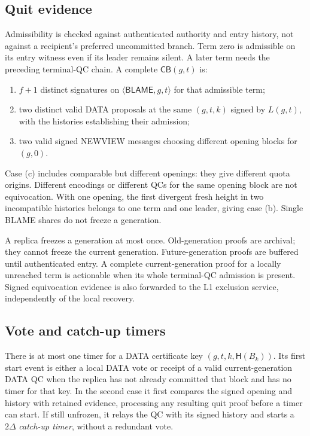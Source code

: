 \documentclass[11pt,a4paper]{article}
\newcommand{\CB}{\mathsf{CB}}
\newcommand{\Hash}{\mathsf H}
\newcommand{\tagg}[1]{\mathsf{#1}}
\begin{document}
\subsection{Quit evidence}
\label{sec:evidence}
Admissibility is checked against authenticated authority and entry history,
not against a recipient's preferred uncommitted branch. Term zero is
admissible on its entry witness even if its leader remains silent. A
later term needs the preceding terminal-QC chain.
A complete $\CB(g,t)$ is:
\begin{enumerate}[label=(\alph*)]
\item $f+1$ distinct signatures on $\langle\tagg{BLAME},g,t\rangle$
for that admissible term;
\item two distinct valid DATA proposals at the same $(g,t,k)$ signed
by $L(g,t)$, with the histories establishing their admission;
\item two valid signed NEWVIEW messages choosing different opening
blocks for $(g,0)$.
\end{enumerate}
Case (c) includes comparable but different openings: they give different
quota origins. Different encodings or different QCs for the same opening
block are not equivocation. With one opening, the first divergent fresh
height in two incompatible histories belongs to one term and one leader,
giving case (b). Single BLAME shares do not freeze a generation.

A replica freezes a generation at most once. Old-generation proofs are
archival; they cannot freeze the current generation. Future-generation
proofs are buffered until authenticated entry. A complete current-generation
proof for a locally unreached term is actionable when its whole
terminal-QC admission is present. Signed equivocation evidence is also
forwarded to the L1 exclusion service, independently of the local recovery.

\subsection{Vote and catch-up timers}
\label{sec:timers}
There is at most one timer for a DATA certificate key
$(g,t,k,\Hash(B_k))$. Its first start event is either a local DATA vote
or receipt of a valid current-generation DATA QC when the replica has
not already committed that block and has no timer for that key. In the
second case it first compares the signed opening and history with retained
evidence, processing any resulting quit proof before a timer can start.
If still unfrozen, it relays the QC with its signed history and starts a
$2\Delta$ \emph{catch-up timer}, without a redundant vote.
\end{document}
